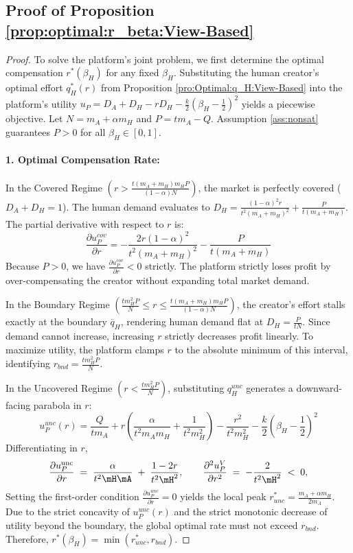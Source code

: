 \subsection*{Proof of Proposition \ref{prop:optimal:r_beta:View-Based}}
\begin{proof}
To solve the platform's joint problem, we first determine the optimal compensation $r^*(\beta_H)$ for any fixed $\beta_H$. Substituting the human creator's optimal effort $q_H^*(r)$ from Proposition \ref{pro:Optimal:q_H:View-Based} into the platform's utility $u_P = D_A + D_H - r D_H - \frac{k}{2}\left(\beta_H - \frac{1}{2}\right)^2$ yields a piecewise objective. Let $N = m_A + \alpha m_H$ and $P = t m_A - Q$. Assumption \ref{ass:nonsat} guarantees $P > 0$ for all $\beta_H \in [0,1]$.

\paragraph{1. Optimal Compensation Rate:} 
In the Covered Regime $\left(r > \frac{t(m_A+m_H)m_H P}{(1-\alpha)N}\right)$, the market is perfectly covered ($D_A + D_H = 1$). The human demand evaluates to $D_H = \frac{(1-\alpha)^2 r}{t^2(m_A+m_H)^2} + \frac{P}{t(m_A+m_H)}$. The partial derivative with respect to $r$ is:
\begin{equation*}
    \frac{\partial u_P^{cov}}{\partial r} = - \frac{2r(1-\alpha)^2}{t^2(m_A+m_H)^2} - \frac{P}{t(m_A+m_H)}
\end{equation*}
Because $P > 0$, we have $\frac{\partial u_P^{cov}}{\partial r} < 0$ strictly. The platform strictly loses profit by over-compensating the creator without expanding total market demand.

In the Boundary Regime $\left(\frac{t m_H^2 P}{N} \le r \le \frac{t(m_A+m_H)m_H P}{(1-\alpha)N}\right)$, the creator's effort stalls exactly at the boundary $\overline{q}_H$, rendering human demand flat at $D_H = \frac{P}{t N}$. Since demand cannot increase, increasing $r$ strictly decreases profit linearly. To maximize utility, the platform clamps $r$ to the absolute minimum of this interval, identifying $r_{bnd} = \frac{t m_H^2 P}{N}$.

In the Uncovered Regime $\left(r < \frac{t m_H^2 P}{N}\right)$, substituting $q_H^{unc}$ generates a downward-facing parabola in $r$:
\begin{equation*}
    u_P^{unc}(r) = \frac{Q}{t m_A} + r \left( \frac{\alpha}{t^2 m_A m_H} + \frac{1}{t^2 m_H^2} \right) - \frac{r^2}{t^2 m_H^2} - \frac{k}{2}\left(\beta_H - \frac{1}{2}\right)^2
\end{equation*}
Differentiating in $r$,
\[
\frac{\partial u_P^{\mathrm{unc}}}{\partial r} 
\;=\; \frac{\alpha}{t^{2}\mH\mA} \;+\; \frac{1 - 2r}{t^{2}\mH^{2}}, 
\qquad 
\frac{\partial^{2} u_P^{V}}{\partial r^{2}} 
\;=\; -\frac{2}{t^{2}\mH^{2}} \;<\; 0,
\]
Setting the first-order condition $\frac{\partial u_P^{unc}}{\partial r} = 0$ yields the local peak $r_{unc}^* = \frac{m_A + \alpha m_H}{2 m_A}$. Due to the strict concavity of $u_P^{unc}(r)$ and the strict monotonic decrease of utility beyond the boundary, the global optimal rate must not exceed $r_{bnd}$. Therefore, $r^*(\beta_H) = \min(r_{unc}^*, r_{bnd})$.


\end{proof}
